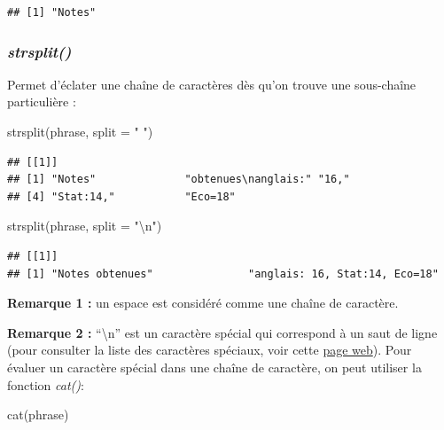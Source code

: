 \documentclass[
]{book}
\newenvironment{Shaded}{\begin{snugshade}}{\end{snugshade}}
\newcommand{\AttributeTok}[1]{\textcolor[rgb]{0.77,0.63,0.00}{#1}}
\newcommand{\FunctionTok}[1]{\textcolor[rgb]{0.00,0.00,0.00}{#1}}
\newcommand{\NormalTok}[1]{#1}
\newcommand{\SpecialCharTok}[1]{\textcolor[rgb]{0.00,0.00,0.00}{#1}}
\newcommand{\StringTok}[1]{\textcolor[rgb]{0.31,0.60,0.02}{#1}}
\theoremstyle{definition}
\theoremstyle{definition}
\theoremstyle{definition}
\theoremstyle{definition}
\theoremstyle{remark}
\begin{document}
\begin{verbatim}
## [1] "Notes"
\end{verbatim}

\hypertarget{strsplit}{%
\subsubsection{\texorpdfstring{\emph{strsplit()}}{strsplit()}}\label{strsplit}}

Permet d'éclater une chaîne de caractères dès qu'on trouve une sous-chaîne particulière :

\begin{Shaded}
\begin{Highlighting}[]
\FunctionTok{strsplit}\NormalTok{(phrase, }\AttributeTok{split =} \StringTok{" "}\NormalTok{)}
\end{Highlighting}
\end{Shaded}

\begin{verbatim}
## [[1]]
## [1] "Notes"              "obtenues\nanglais:" "16,"               
## [4] "Stat:14,"           "Eco=18"
\end{verbatim}

\begin{Shaded}
\begin{Highlighting}[]
\FunctionTok{strsplit}\NormalTok{(phrase, }\AttributeTok{split =} \StringTok{"}\SpecialCharTok{\textbackslash{}n}\StringTok{"}\NormalTok{)}
\end{Highlighting}
\end{Shaded}

\begin{verbatim}
## [[1]]
## [1] "Notes obtenues"               "anglais: 16, Stat:14, Eco=18"
\end{verbatim}

\textbf{Remarque 1 :} un espace est considéré comme une chaîne de caractère.

\textbf{Remarque 2 :} ``\textbackslash n'' est un caractère spécial qui correspond à un saut de ligne (pour consulter la liste des caractères spéciaux, voir cette \href{http://help.stonesoft.com/onlinehelp/StoneGate/SMC/5.3.6/SGAG/SG_RegularExpressions/Special_Character_Sequences.htm}{page web}). Pour évaluer un caractère spécial dans une chaîne de caractère, on peut utiliser la fonction \emph{cat()}:

\begin{Shaded}
\begin{Highlighting}[]
\FunctionTok{cat}\NormalTok{(phrase)}
\end{Highlighting}
\end{Shaded}
\end{document}

